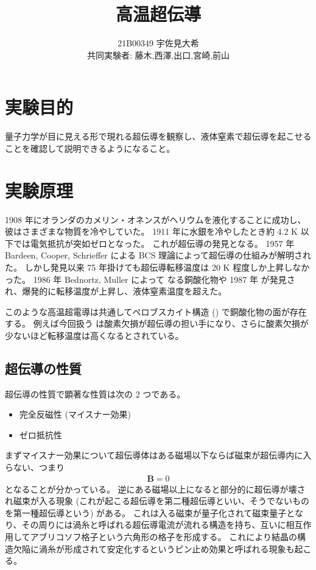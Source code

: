 \documentclass[uplatex,dvipdfmx,a4paper,11pt]{jlreq}
\title{高温超伝導}
\author{21B00349 宇佐見大希 \\ 共同実験者: 藤木,西澤,出口,宮崎,前山}
\numberwithin{equation}{section}
\theoremstyle{definition}
\begin{document}
\maketitle
\tableofcontents
\clearpage

\section{実験目的}
量子力学が目に見える形で現れる超伝導を観察し、液体窒素で超伝導を起こせることを確認して説明できるようになること。

\section{実験原理}
1908 年にオランダのカメリン・オネンスがヘリウムを液化することに成功し、彼はさまざまな物質を冷やしていた。
1911 年に水銀を冷やしたとき約 4.2 \si{K} 以下では電気抵抗が突如ゼロとなった。
これが超伝導の発見となる。
1957 年 Bardeen, Cooper, Schrieffer による BCS 理論によって超伝導の仕組みが解明された。
しかし発見以来 75 年掛けても超伝導転移温度は 20 \si{K} 程度しか上昇しなかった。
1986 年 Bednortz, Muller によって  なる銅酸化物や 1987 年  が発見され、爆発的に転移温度が上昇し、液体窒素温度を超えた。

このような高温超電導は共通してペロブスカイト構造 () で銅酸化物の面が存在する。
例えば今回扱う  は酸素欠損が超伝導の担い手になり、さらに酸素欠損が少ないほど転移温度は高くなるとされている。


\subsection{超伝導の性質}
超伝導の性質で顕著な性質は次の 2 つである。
\begin{itemize}
  \item 完全反磁性 (マイスナー効果)
  \item ゼロ抵抗性
\end{itemize}
まずマイスナー効果について超伝導体はある磁場以下ならば磁束が超伝導内に入らない、つまり
\begin{align}
  \bm{B} = 0
\end{align}
となることが分かっている。
逆にある磁場以上になると部分的に超伝導が壊され磁束が入る現象 (これが起こる超伝導を第二種超伝導といい、そうでないものを第一種超伝導という) がある。
これは入る磁束が量子化されて磁束量子となり、その周りには渦糸と呼ばれる超伝導電流が流れる構造を持ち、互いに相互作用してアブリコソフ格子という六角形の格子を形成する。
これにより結晶の構造欠陥に渦糸が形成されて安定化するというピン止め効果と呼ばれる現象も起こる。
\end{document}
